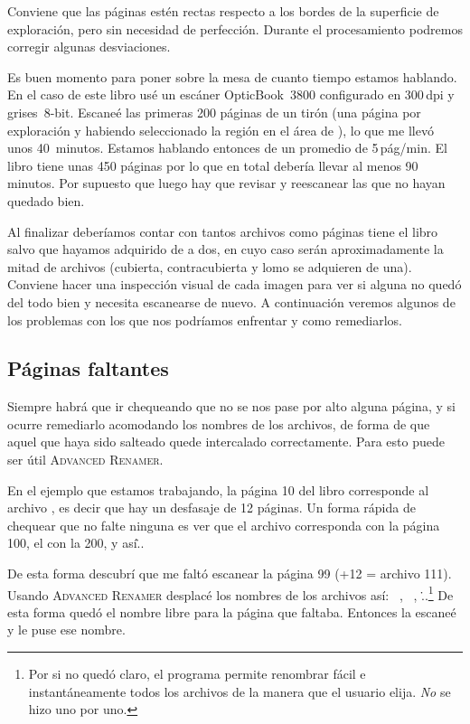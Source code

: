 \documentclass[%
	a5paper,
	10pt,
	twoside,
	openright,
	final,
]{memoir}
\begin{document}
{	Conviene que las páginas estén rectas respecto a los bordes de la superficie de exploración, pero sin necesidad de perfección. Durante el procesamiento podremos corregir algunas desviaciones.

	Es buen momento para poner sobre la mesa de cuanto tiempo estamos hablando. En el caso de este libro usé un escáner OpticBook~3800 configurado en 300\,dpi y grises~8-bit. Escaneé las primeras 200 páginas de un tirón (una página por exploración y habiendo seleccionado la región en el área de ), lo que me llevó unos 40~minutos. Estamos hablando entonces de un promedio de 5\,pág/min. El libro tiene unas 450 páginas por lo que en total debería llevar al menos 90 minutos. Por supuesto que luego hay que revisar y reescanear las que no hayan quedado bien.

	Al finalizar deberíamos contar con tantos archivos como páginas tiene el libro salvo que hayamos adquirido de a dos, en cuyo caso serán aproximadamente la mitad de archivos (cubierta, contracubierta y lomo se adquieren de una). Conviene hacer una inspección visual de cada imagen para ver si alguna no quedó del todo bien y necesita escanearse de nuevo. A continuación veremos algunos de los problemas con los que nos podríamos enfrentar y como remediarlos.

	\subsection{Páginas faltantes} Siempre habrá que ir chequeando que no se nos pase por alto alguna página, y si ocurre remediarlo acomodando los nombres de los archivos, de forma de que aquel que haya sido salteado quede intercalado correctamente. Para esto puede ser útil \textsc{Advanced Renamer}.

	En el ejemplo que estamos trabajando, la página 10 del libro corresponde al archivo , es decir que hay un desfasaje de 12 páginas. Un forma rápida de chequear que no falte ninguna es ver que el archivo  corresponda con la página 100, el  con la 200, y así\...

	De esta forma descubrí que me faltó escanear la página 99 (+12 = archivo 111). Usando \textsc{Advanced Renamer} desplacé los nombres de los archivos así:  \faLongArrowAltRight\ ,  \faLongArrowAltRight\ , \...\footnote{Por si no quedó claro, el programa permite renombrar fácil e instantáneamente todos los archivos de la manera que el usuario elija. \emph{No} se hizo uno por uno.} De esta forma quedó el nombre  libre para la página que faltaba. Entonces la escaneé y le puse ese nombre.

}
\end{document}

